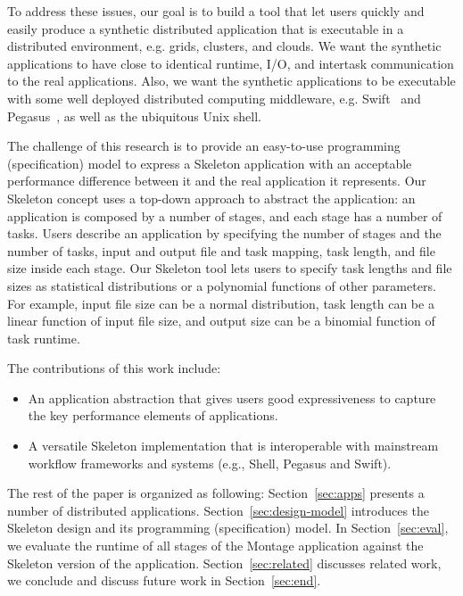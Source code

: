 \documentclass{sig-alternate}
\newenvironment{shortlist}{
        \vspace*{-0.5em}
  \begin{itemize}
  \setlength{\itemsep}{-0.1em}
}{
  \end{itemize}
        \vspace*{-0.5em}
}
\begin{document}
To address these issues, our goal is to build a tool that let users quickly and easily produce a synthetic distributed application
that is executable in a distributed environment, e.g. grids, clusters, and clouds. We want the  synthetic
applications to have close to identical runtime, I/O, and intertask communication to the real applications.
Also, we want the synthetic applications to be executable with some well deployed distributed computing middleware, 
e.g. Swift~\cite{Swift_2011} and Pegasus~\cite{pegasus}, as well as the ubiquitous Unix shell.

The challenge of this research is to provide an easy-to-use programming (specification) model to express a Skeleton application with 
an acceptable performance difference between it and the real application it represents. Our Skeleton concept uses a top-down approach
to abstract the application: an application is composed by a number of stages, and each stage has a number of tasks. Users describe
an application by specifying the number of stages and the number of tasks, input and output file and task mapping, task length, and file size
inside each stage. Our Skeleton tool lets users to specify task lengths and file sizes as statistical distributions or a polynomial functions
of other parameters. For example, input file size can be a normal distribution, task length can be a linear function of input file size, and output size can be a binomial function
of task runtime. 

The contributions of this work include:
\begin{shortlist}
\item {} An application abstraction that gives users good expressiveness to capture the key performance elements of applications. 
\item {} A versatile Skeleton implementation that is interoperable with mainstream workflow frameworks and systems (e.g., Shell, Pegasus and Swift).
\end{shortlist}

The rest of the paper is organized as following: Section~\ref{sec:apps} presents a number of distributed applications.
Section~\ref{sec:design-model} introduces the Skeleton design and its programming (specification) model. In Section~\ref{sec:eval}, 
we evaluate the runtime of all stages of the Montage application against the Skeleton version of the application. 
Section~\ref{sec:related} discusses related work, we conclude and discuss future work in Section~\ref{sec:end}.
\end{document}
